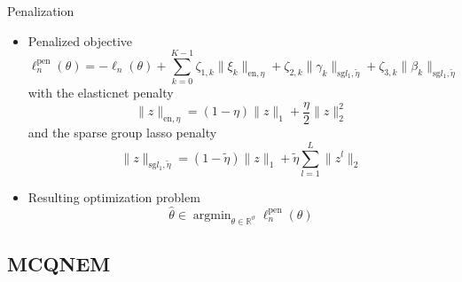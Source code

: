 \documentclass{beamer}
\DeclareMathOperator{\argmin}{argmin}
\newcommand{\R}{\mathbb R}
\newcommand{\norm}[1]{\|#1\|}
\begin{document}
\begin{frame}{Penalization}

\small

\begin{itemize}
  \item<1-> Penalized objective
  \begin{equation*}
  \ell_n^\text{pen}(\theta) = - \ell_n(\theta) + \sum_{k=0}^{K-1} \zeta_{1,k} \norm{\xi_k}_{\text{en}, \eta} + \zeta_{2,k} \norm{\gamma_k}_{\text{sg} l_1, \tilde{\eta}} + \zeta_{3,k} \norm{\beta_k}_{\text{sg} l_1, \tilde{\eta}}
  \end{equation*}
  with the elasticnet penalty \[ \norm{z}_{\text{en}, \eta} = (1-\eta)\norm{z}_1 + \dfrac\eta2 \norm{z}_2^2 \] and the sparse group lasso penalty \[ \norm{z}_{\text{sg} l_1, \tilde{\eta}} = (1-\tilde{\eta})\norm{z}_1 + \tilde{\eta} \sum_{l=1}^L\norm{z^l}_2 \]
  \item<2-> Resulting optimization problem \[\hat \theta \in \argmin_{\theta \in \R^\vartheta} \ell_n^\text{pen}(\theta)\]
\end{itemize}

\end{frame}

\subsection{MCQNEM}
\end{document}
